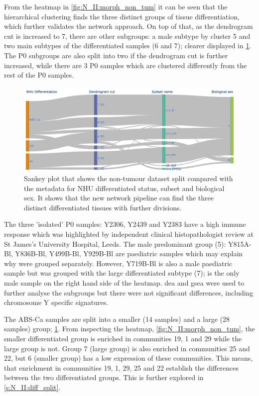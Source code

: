 From the heatmap in \cref{fig:N_II:morph_non_tum} it can be seen that the hierarchical clustering finds the three distinct groups of tissue differentiation, which further validates the network approach. On top of that, as the dendrogram cut is increased to 7, there are other subgroups: a male subtype by cluster 5 and two main subtypes of the differentiated samples (6 and 7); clearer displayed in \cref{fig:N_II:non_tum_sankey_comp}. The P0 subgroups are also split into two if the dendrogram cut is further increased, while there are 3 P0 samples which are clustered differently from the rest of the P0 samples. 

\begin{figure}[!t]    
    \centering
    \includegraphics[width=1.0\textwidth,keepaspectratio]{Sections/Network_II/resources/non_tum/non_tum_split.png}
    \caption[Split of the non-tumour dataset]{Sankey plot that shows the non-tumour dataset split compared with the metadata for NHU differentiated status, subset and biological sex. It shows that the new network pipeline can find the three distinct differentiated tissues with further divisions.}
    \label{fig:N_II:non_tum_sankey_comp}
\end{figure}

The three 'isolated' P0 samples: Y2306, Y2439 and Y2383 have a high immune response which was highlighted by independent clinical histopathologist review at St James's University Hospital, Leeds. The male predominant group (5): Y815A-Bl, Y836B-Bl, Y499B-Bl, Y929B-Bl are paediatric samples which may explain why were grouped separately. However, Y719B-Bl is also a male paediatric sample but was grouped with the large differentiated subtype (7); is the only male sample on the right hand side of the heatmap. \acrfull{dea} and \acrfull{gsea} were used to further analyse the subgroups but there were not significant differences, including chromosome Y specific signatures.

The ABS-Ca samples are split into a smaller (14 samples) and a large (28 samples) group; \cref{fig:N_II:non_tum_sankey_comp}. From inspecting the heatmap, \cref{fig:N_II:morph_non_tum}, the smaller differentiated group is enriched in communities 19, 1 and 29 while the large group is not. Group 7 (large group) is also enriched in communities 25 and 22,  but 6 (smaller group) has a low expression of these communities. This means, that enrichment in communities 19, 1, 29, 25 and 22 establish the differences between the two differentiated groups. This is further explored in \cref{s:N_II:diff_split}.


